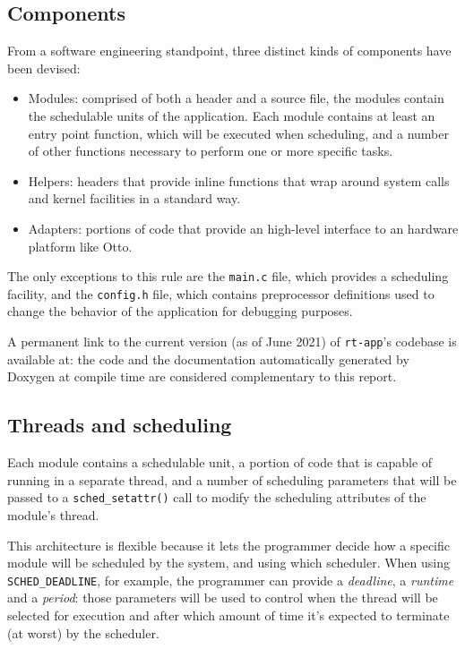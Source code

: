 \documentclass[a4paper,12pt]{report}
\begin{document}
\subsection{Components}

From a software engineering standpoint, three distinct kinds of components have been devised:
\begin{itemize}
    \item Modules: comprised of both a header and a source file, the modules contain the schedulable units of the application. Each module contains at least an entry point function, which will be executed when scheduling, and a number of other functions necessary to perform one or more specific tasks.   
    \item Helpers: headers that provide inline functions that wrap around system calls and kernel facilities in a standard way.
    \item Adapters: portions of code that provide an high-level interface to an hardware platform like Otto.
\end{itemize}

The only exceptions to this rule are the \texttt{main.c} file, which provides a scheduling facility, and the \texttt{config.h} file, which contains preprocessor definitions used to change the behavior of the application for debugging purposes.

A permanent link to the current version (as of June 2021) of \texttt{rt-app}'s codebase is available at: the code and the documentation automatically generated by Doxygen at compile time are considered complementary to this report.

\subsection{Threads and scheduling}

Each module contains a schedulable unit, a portion of code that is capable of running in a separate thread, and a number of scheduling parameters that will be passed to a \texttt{sched\_setattr()} call to modify the scheduling attributes of the module's thread.

This architecture is flexible because it lets the programmer decide how a specific module will be scheduled by the system, and using which scheduler. When using \texttt{SCHED\_DEADLINE}, for example, the programmer can provide a \textit{deadline}, a \textit{runtime} and a \textit{period}: those parameters will be used to control when the thread will be selected for execution and after which amount of time it's expected to terminate (at worst) by the scheduler.
\end{document}
